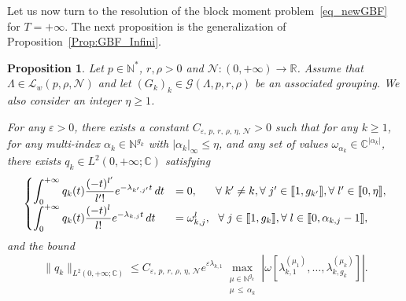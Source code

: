 \documentclass[11pt]{article}
\newtheorem{prop}[theo]{Proposition}
\theoremstyle{definition}
\numberwithin{equation}{section}
\numberwithin{figure}{section}
\numberwithin{table}{section}
\newcommand{\llbracket}{\mathopen{[\mkern -2.7mu[}}
\newcommand{\rrbracket}{\mathclose{]\mkern -2.7mu]}}
\newcommand{\inter}[2]{\llbracket #1,#2 \rrbracket}
\newcommand{\n}{g}
\newcommand{\LL}{\mathcal{L}}
\newcommand{\NN}{\mathcal{N}}
\newcommand{\N}{\mathbb{N}}
\newcommand{\R}{\mathbb{R}}
\newcommand{\C}{\mathbb{C}}
\let\oldforall\forall
\renewcommand*{\forall}{\mathrel{\oldforall}}
\begin{document}
Let us now turn to the resolution of the block moment problem~\eqref{eq_newGBF} for $T=+\infty$. The next proposition is the generalization of Proposition~\ref{Prop:GBF_Infini}.

\begin{prop}\label{Prop:newGBF_Infini}
Let $p \in \N^*$, $r, \rho > 0$ and $\NN : (0,+\infty) \to \R$. Assume that $\Lambda \in \LL_w(p,\rho, \NN)$ and let $(G_k)_k\in \mathcal{G}(\Lambda,p,r,\rho)$ be an associated grouping. We also consider an integer $\eta\geq 1$.

For any $\varepsilon > 0$, there exists a constant $C_{\varepsilon,\, p, \,r, \,\rho,\, \eta,\, \NN} >0$ such that for any $k \geq 1$, for any multi-index $\alpha_k\in \N^{\n_k}$ with $|\alpha_k|_\infty\leq \eta$, and any set of values $\omega_{\alpha_k} \in \C^{|\alpha_k|}$, there exists $q_k \in L^2(0,+\infty; \C)$ satisfying
\begin{equation*}\label{eq_newGBF_Infini}
\begin{cases}
\displaystyle\int_0^{+\infty} q_k(t) \frac{(-t)^{l'}}{l'!} e^{-\lambda_{k',j'}t} \, dt & = 0, \mkern30mu \forall k'\neq k, \forall j'\in \inter{1}{\n_{k'}}, \forall l'\in \inter{0}{\eta},\\[0.15em]
\displaystyle\int_0^{+\infty} q_k(t) \frac{(-t)^l}{l!} e^{-\lambda_{k,j}t} \, dt & = \omega_{k,j}^l, \ \ \forall j\in \inter{1}{\n_{k}}, \forall l\in \inter{0}{\alpha_{k,j}-1},\\
\end{cases}
\end{equation*}
and the bound
\begin{equation}\label{bound_qk_multiplicities_Infini}
\|q_k\|_{L^2(0,+\infty;\C)}\leq C_{\varepsilon,\, p,\, r,\, \rho,\, \eta,\, \NN} e^{\varepsilon \lambda_{k,1}} \max\limits_{\substack{\mu\in \N^{\n_k} \\ \mu\,\leq\,\alpha_k}} \left| \omega\left[\lambda_{k,1}^{(\mu_1)},\dotsc,\lambda_{k,\n_k}^{(\mu_k)}\right] \right|.
\end{equation}
\end{prop}
\end{document}
